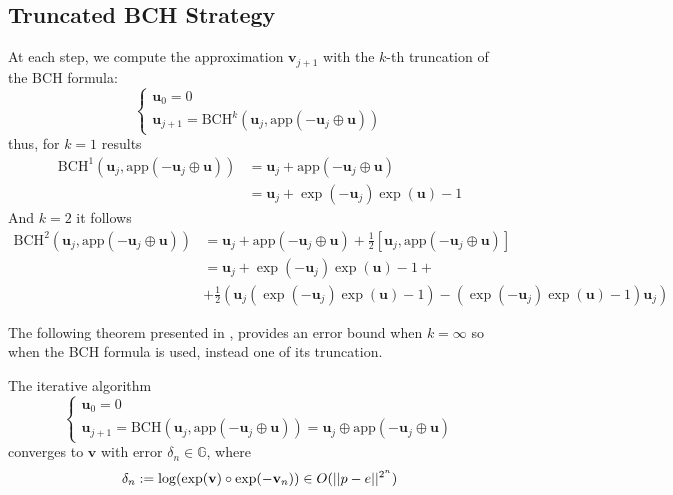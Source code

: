 \subsection{Truncated BCH Strategy}
At each step, we compute the approximation $\mathbf{v}_{j+1}$ with the $k$-th truncation of the BCH formula:
\begin{equation}\label{eq:bossa_strat}
\begin{cases}
\mathbf{u}_0 = 0 \\
\mathbf{u}_{j+1} = \text{BCH}^{k}(\mathbf{u}_{j}, \text{app}(-\mathbf{u}_{j}  \oplus  \mathbf{u} ))
\end{cases}
\end{equation}
thus, for $k=1$ results 
\begin{align*}
\text{BCH}^{1}(\mathbf{u}_{j}, \text{app}(-\mathbf{u}_{j}  \oplus  \mathbf{u} ))
&=
\mathbf{u}_{j} +  \text{app}(-\mathbf{u}_{j}  \oplus  \mathbf{u} )\\
&=
\mathbf{u}_{j} + \exp(-\mathbf{u}_{j}) \exp( \mathbf{u})  - 1
\end{align*}
And $k=2$ it follows
\begin{align*}
\text{BCH}^{2}(\mathbf{u}_{j}, \text{app}(-\mathbf{u}_{j}  \oplus  \mathbf{u} ))
&=
\mathbf{u}_{j} +  \text{app}(-\mathbf{u}_{j}  \oplus  \mathbf{u} ) + \frac{1}{2}[\mathbf{u}_{j},  \text{app}(-\mathbf{u}_{j}  \oplus  \mathbf{u} )]\\
&=
\mathbf{u}_{j} + \exp(-\mathbf{u}_{j}) \exp( \mathbf{u})  - 1 + \\
&+ \frac{1}{2}(  \mathbf{u}_{j}( \exp(-\mathbf{u}_{j}) \exp( \mathbf{u})  - 1) -  ( \exp(-\mathbf{u}_{j}) \exp( \mathbf{u})  - 1)\mathbf{u}_{j})
\end{align*}

The following theorem presented in \cite{Bossa:08}, provides an error bound when $k = \infty$ so when the BCH formula is used, instead one of its truncation.
\begin{theorem}[Bossa]\label{th:bossa}
	The iterative algorithm 
	\begin{equation}
	\begin{cases}
	\mathbf{u}_0 = 0 \\
	\mathbf{u}_{j+1} = \text{BCH}(\mathbf{u}_{j}, \text{app}(-\mathbf{u}_{j}  \oplus  \mathbf{u} ))
	                          = \mathbf{u}_{j} \oplus  \text{app}(-\mathbf{u}_{j}  \oplus  \mathbf{u} )
	\end{cases}
	\end{equation}
	converges to $\mathbf{v}$ with error $\delta_n \in \mathbb{G}$, where
	\begin{align*}
	\delta_{n} := \log(\exp(\mathbf{v})\circ \exp(-\mathbf{v}_{n})) \in O(\vert\lvert p - e \rvert\vert^{2^{n}})
	\end{align*}
\end{theorem}

